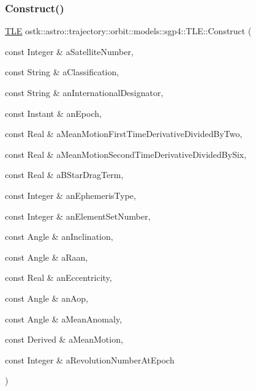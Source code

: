 \subsubsection{\texorpdfstring{Construct()}{Construct()}\hspace{0.1cm}{\footnotesize\ttfamily [2/2]}}
{\footnotesize\ttfamily \hyperlink{classostk_1_1astro_1_1trajectory_1_1orbit_1_1models_1_1sgp4_1_1_t_l_e}{T\+LE} ostk\+::astro\+::trajectory\+::orbit\+::models\+::sgp4\+::\+T\+L\+E\+::\+Construct (\begin{DoxyParamCaption}\item[{const Integer \&}]{a\+Satellite\+Number,  }\item[{const String \&}]{a\+Classification,  }\item[{const String \&}]{an\+International\+Designator,  }\item[{const Instant \&}]{an\+Epoch,  }\item[{const Real \&}]{a\+Mean\+Motion\+First\+Time\+Derivative\+Divided\+By\+Two,  }\item[{const Real \&}]{a\+Mean\+Motion\+Second\+Time\+Derivative\+Divided\+By\+Six,  }\item[{const Real \&}]{a\+B\+Star\+Drag\+Term,  }\item[{const Integer \&}]{an\+Ephemeris\+Type,  }\item[{const Integer \&}]{an\+Element\+Set\+Number,  }\item[{const Angle \&}]{an\+Inclination,  }\item[{const Angle \&}]{a\+Raan,  }\item[{const Real \&}]{an\+Eccentricity,  }\item[{const Angle \&}]{an\+Aop,  }\item[{const Angle \&}]{a\+Mean\+Anomaly,  }\item[{const Derived \&}]{a\+Mean\+Motion,  }\item[{const Integer \&}]{a\+Revolution\+Number\+At\+Epoch }\end{DoxyParamCaption})\hspace{0.3cm}{\ttfamily [static]}}

\mbox{\label{classostk_1_1astro_1_1trajectory_1_1orbit_1_1models_1_1sgp4_1_1_t_l_e_a4f9d8d752fc3700fd9bac043f106e19b}} 
